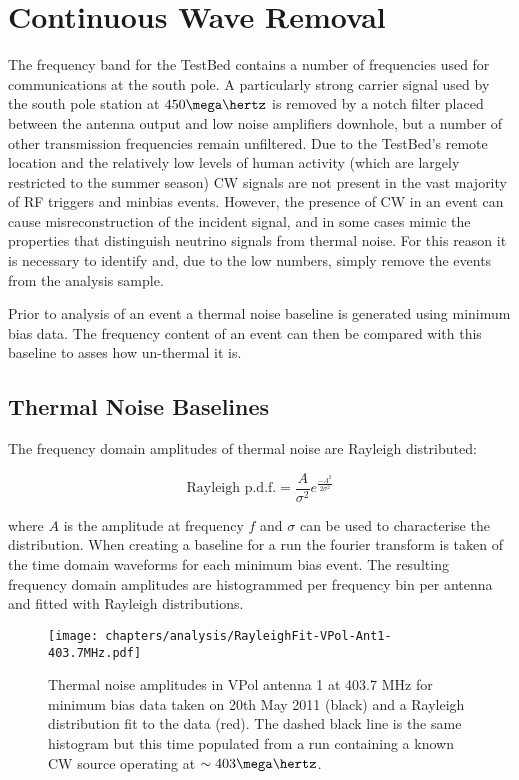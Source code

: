\section{Continuous Wave Removal}
\label{sec:Analysis:CWRemoval}

The frequency band for the TestBed contains a number of frequencies used for communications at the south pole. A particularly strong carrier signal used by the south pole station at $450 \mega \hertz$ is removed by a notch filter placed between the antenna output and low noise amplifiers downhole, but a number of other transmission frequencies remain unfiltered. Due to the TestBed's remote location and the relatively low levels of human activity (which are largely restricted to the summer season) CW signals are not present in the vast majority of RF triggers and minbias events. However, the presence of CW in an event can cause misreconstruction of the incident signal, and in some cases mimic the properties that distinguish neutrino signals from thermal noise. For this reason it is necessary to identify and, due to the low numbers, simply remove the events from the analysis sample.

Prior to analysis of an event a thermal noise baseline is generated using minimum bias data. The frequency content of an event can then be compared with this baseline to asses how un-thermal it is. 

\subsection{Thermal Noise Baselines}
\label{sec:Analysis:CWRemoval:Baselines}

The frequency domain amplitudes of thermal noise are Rayleigh distributed:

\begin{equation}
  \mbox{Rayleigh p.d.f.} = \frac{A}{\sigma^{2}}e^{\frac{-A^{2}}{2\sigma^{2}}}
  \label{eq:Analysis:CWRemoval:Rayleigh-pdf}
\end{equation}

\noindent where $A$ is the amplitude at frequency $f$ and $\sigma$ can be used to characterise the distribution. When creating a baseline for a run the fourier transform is taken of the time domain waveforms for each minimum bias event. The resulting frequency domain amplitudes are histogrammed per frequency bin per antenna and fitted with Rayleigh distributions.


\begin{figure}[htpb]
  \centering
  \texttt{[image: chapters/analysis/RayleighFit-VPol-Ant1-403.7MHz.pdf]}
  \caption{Thermal noise amplitudes in VPol antenna 1 at 403.7 MHz for minimum bias data taken on 20th May 2011 (black) and a Rayleigh distribution fit to the data (red). The dashed black line is the same histogram but this time populated from a run containing a known CW source operating at $\sim 403 \mega \hertz$.}
  \label{fig:analysis:CWRemoval:Baselines:Rayleigh-Fit}
\end{figure}



